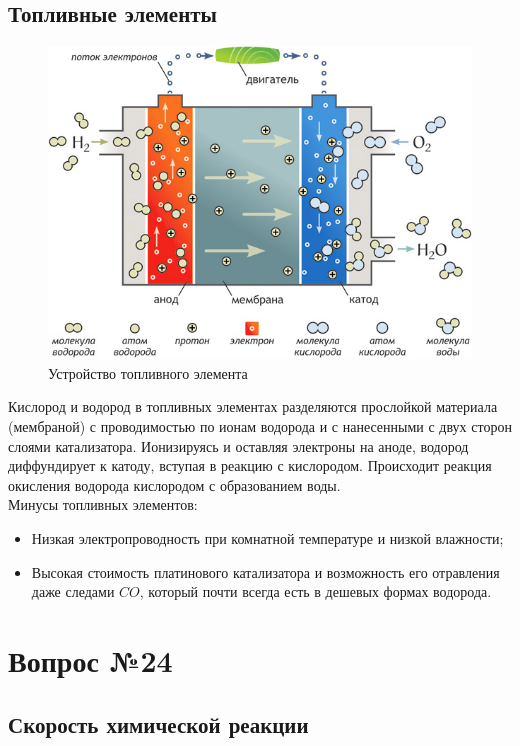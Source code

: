 \documentclass[14pt,a4paper]{scrartcl}
\begin{document}
\subsection*{Топливные элементы}
\begin{figure}[H]
	\includegraphics[scale=0.8]{ttt.jpg}
	\centering
	\caption{Устройство топливного элемента}
\end{figure}
Кислород и водород в топливных элементах разделяются прослойкой материала (мембраной) с проводимостью по ионам водорода и с нанесенными с двух сторон слоями катализатора. Ионизируясь и оставляя электроны на аноде, водород диффундирует к катоду, вступая в реакцию с кислородом. Происходит реакция окисления водорода кислородом с образованием воды.\\
Минусы топливных элементов:
\begin{itemize}
	\item Низкая электропроводность при комнатной температуре и низкой влажности;
	\item Высокая стоимость платинового катализатора и возможность его отравления даже следами $CO$, который почти всегда есть в дешевых формах водорода.
\end{itemize}

\section*{Вопрос №24}

\subsection*{Скорость химической реакции}
\end{document}

